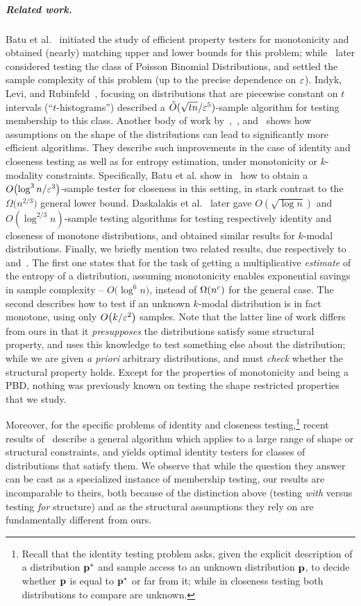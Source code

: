 \subparagraph{Related work.} Batu et al.~\cite{BKR:04} initiated the study of efficient property testers for monotonicity and obtained (nearly) matching upper and lower bounds for this problem; while~\cite{AD:15} later considered testing the class of Poisson Binomial Distributions, and settled the sample complexity of this problem (up to the precise dependence on $\varepsilon$). Indyk, Levi, and Rubinfeld~\cite{ILR:12}, focusing on distributions that are piecewise constant on $t$ intervals (``$t$-histograms'') described a $\tilde{O}(\sqrt{tn}/\varepsilon^5)$-sample algorithm for testing membership to this class. Another body of work by~\cite{BDKR:05},~\cite{BKR:04}, and~\cite{DDSVV:13} shows how assumptions on the shape of the distributions can lead to significantly more efficient algorithms. They describe such improvements in the case of identity and closeness testing as well as for entropy estimation, under monotonicity or $k$-modality constraints. Specifically, Batu et al. show in~\cite{BKR:04} how to obtain a $O\big({\log^3 n/\varepsilon^3}\big)$-sample tester for closeness in this setting, in stark contrast to the $\Omega\big({{n}^{2/3}}\big)$ general lower bound. Daskalakis et al.~\cite{DDSVV:13} later gave ${O}(\sqrt{\log n})$ and ${O}({\log^{2/3} n})$-sample testing algorithms for testing respectively identity and closeness of monotone distributions, and obtained similar results for $k$-modal distributions. Finally, we briefly mention two related results, due respectively to~\cite{BDKR:05} and~\cite{DDS:12}. The first one states that for the task of getting a multiplicative \emph{estimate} of the entropy of a distribution, assuming monotonicity enables exponential savings in sample complexity -- $O\big({\log^6 n}\big)$, instead of $\bigOmega{n^c}$ for the general case. The second describes how to test if an unknown $k$-modal distribution is in fact monotone, using only $\bigO{k/\eps^2}$ samples. Note that the latter line of work differs from ours in that it \emph{presupposes} the distributions satisfy some structural property, and uses this knowledge to test something else about the distribution; while we are given \textit{a priori} arbitrary distributions, and must \emph{check} whether the structural property holds. Except for the properties of monotonicity and being a PBD, nothing was previously known on testing the shape restricted properties that we study.

Moreover, for the specific problems of identity and closeness testing,\footnote{Recall that the identity testing problem asks, given the explicit description of a distribution $\mathbf{p}^\ast$ and sample access to an unknown distribution $\mathbf{p}$, to decide whether $\mathbf{p}$ is equal to $\mathbf{p}^\ast$ or far from it; while in closeness testing both distributions to compare are unknown.} recent results of~\cite{DKN:15,DKN:15:FOCS} describe a general algorithm which applies to a large range of shape or structural constraints, and yields optimal identity testers for classes of distributions that satisfy them. We observe that while the question they answer can be cast as a specialized instance of membership testing, our results are incomparable to theirs, both because of the distinction above (testing \emph{with} versus testing \emph{for} structure) and as the structural assumptions they rely on are fundamentally different from ours.


